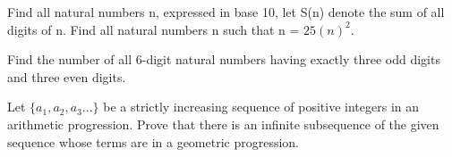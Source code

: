 \item Find all natural numbers n, expressed in base 10, let S(n) denote the sum of all digits of n. Find all natural numbers n such that n = $25(n)^2$.

\item Find the number of all 6-digit natural numbers having exactly three odd digits and three even digits.

\item Let $\{a_1, a_2, a_3...\}$ be a strictly increasing sequence of positive integers in an arithmetic progression. Prove that there is an infinite subsequence of the given sequence whose terms are in a geometric progression.
